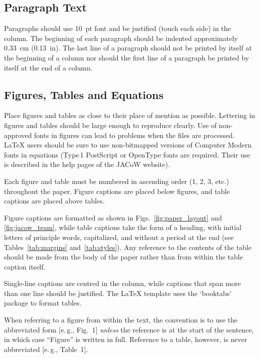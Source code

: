 \subsection{Paragraph Text}

Paragraphs should use \SI{10}{pt} font and be justified (touch each side) in
the column. The beginning of each paragraph should be indented
approximately \SI{0.33}{cm} (\SI{0.13}{in}). The last line of a paragraph should not be
printed by itself at the beginning of a column nor should the first line of
a paragraph be printed by itself at the end of a column.

\subsection{Figures, Tables and Equations}

Place figures and tables as close to their place of mention as
possible. Lettering in figures and tables should be large enough to
reproduce clearly. Use of non-approved fonts in figures can lead to
problems when the files are processed. \LaTeX{} users should be sure to use
non-bitmapped versions of Computer Modern fonts in equations (Type\,1 PostScript
or OpenType fonts are required. Their use is described in the help 
pages of the JACoW website\cite{jacow-help}).

Each figure and table must be numbered in ascending
order (1, 2, 3, etc.) throughout the paper. 
Figure captions are placed below figures, and table
captions are placed above tables.

Figure captions are formatted as shown in Figs.~\ref{fig:paper_layout} and \ref{fig:jacow_team},
while table captions take the form of a heading,
with initial letters of principle words, capitalized, and
without a period at the end (see Tables~\ref{tab:margins} and~\ref{tab:styles}).
Any reference to the contents of the table should be made from
the body of the paper rather than from within the table
caption itself.

Single-line captions are centred in the column, while captions
that span more than one line should be justified.
The \LaTeX{} template uses the ‘booktabs’ package to
format tables. 

When referring to a figure from within the text, the
convention is to use the abbreviated form [e.\,g., Fig.~1]
\emph{unless} the reference is at the start of the sentence, in
which case “Figure” is written in full. Reference to a
table, however, is never abbreviated [e.\,g., Table~1].


